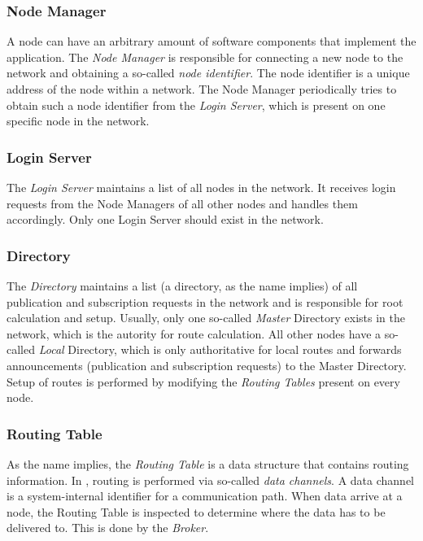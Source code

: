 \subsubsection{Node Manager}

A node can have an arbitrary amount of software components that implement the application.
The \emph{Node Manager} is responsible for connecting a new node to the network and obtaining a so-called \emph{node identifier}.
The node identifier is a unique address of the node within a network.
The Node Manager periodically tries to obtain such a node identifier from the \emph{Login Server},
which is present on one specific node in the network.

\subsubsection{Login Server}

The \emph{Login Server} maintains a list of all nodes in the \xme network.
It receives login requests from the Node Managers of all other nodes and handles them accordingly.
Only one Login Server should exist in the network.

\subsubsection{Directory}

The \emph{Directory} maintains a list (a directory, as the name implies)
of all publication and subscription requests in the network
and is responsible for root calculation and setup.
Usually, only one so-called \emph{Master} Directory exists in the network, which is the autority for route calculation.
All other nodes have a so-called \emph{Local} Directory, which is only authoritative for local routes
and forwards announcements (publication and subscription requests) to the Master Directory.
Setup of routes is performed by modifying the \emph{Routing Tables} present on every node.

\subsubsection{Routing Table}

As the name implies, the \emph{Routing Table} is a data structure that contains routing information.
In \xme, routing is performed via so-called \emph{data channels}.
A data channel is a system-internal identifier for a communication path.
When data arrive at a node, the Routing Table is inspected to determine where the data has to be delivered to.
This is done by the \emph{Broker}.

